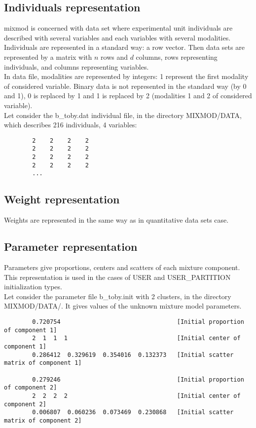 \subsection{Individuals representation}
{\sc mixmod} is concerned with data set where experimental unit
individuals are described with several variables and each
variables with several modalities. Individuals are represented in
a standard way: a row vector. Then data sets are represented by a
matrix with $n$ rows and $d$ columns, rows representing individuals, and columns representing variables.\\
In data file, modalities are represented by integers: 1 represent
the first modality of considered variable. Binary data is not
represented in the standard way (by 0 and 1), 0
is replaced by 1 and 1 is replaced by 2 (modalities 1 and 2 of considered variable).\\
Let consider the b\_toby.dat individual file, in the directory
MIXMOD/DATA, which describes 216 individuals, 4 variables:
{\scriptsize
\begin{verbatim}
        2    2    2    2
        2    2    2    2
        2    2    2    2
        2    2    2    2
        ...
\end{verbatim}}


\subsection{Weight representation}
Weights are represented in the same way as in quantitative data
sets case.

\subsection{Parameter representation}
Parameters give proportions, centers and scatters of each mixture
component. This representation is used in the cases of USER and USER\_PARTITION initialization types.\\
Let consider the parameter file b\_toby.init with 2 clusters, in
the directory MIXMOD/DATA/. It gives values of the unknown mixture
model parameters. {\scriptsize
\begin{verbatim}
        0.720754                                 [Initial proportion of component 1]
        2  1  1  1                               [Initial center of component 1]
        0.286412  0.329619  0.354016  0.132373   [Initial scatter matrix of component 1]

        0.279246                                 [Initial proportion of component 2]
        2  2  2  2                               [Initial center of component 2]
        0.006807  0.060236  0.073469  0.230868   [Initial scatter matrix of component 2]
\end{verbatim}}


